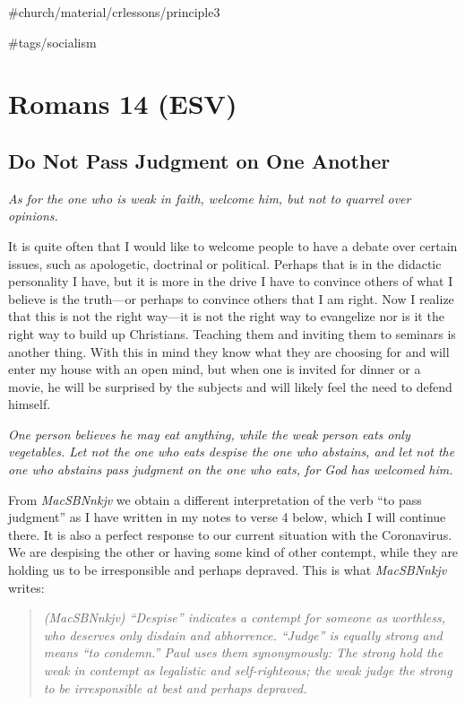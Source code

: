 \#church/material/crlessons/principle3

 \#tags/socialism

\hypertarget{romans-14-esv}{%
\section{Romans 14 (ESV)}\label{romans-14-esv}}
\vspace{10.5cm}
\subsection{Do Not Pass Judgment on One Another} \emph{As for the one who is
weak in faith, welcome him, but not to quarrel over opinions.}

It is quite often that I would like to welcome people to have a debate
over certain issues, such as apologetic, doctrinal or political. Perhaps
that is in the didactic personality I have, but it is more in the drive
I have to convince others of what I believe is the truth---or perhaps to
convince others that I am right. Now I realize that this is not the
right way---it is not the right way to evangelize nor is it the right
way to build up Christians. Teaching them and inviting them to seminars
is another thing. With this in mind they know what they are choosing for
and will enter my house with an open mind, but when one is invited for
dinner or a movie, he will be surprised by the subjects and will likely
feel the need to defend himself.

\emph{One person believes he may eat anything, while the weak person
eats only vegetables. Let not the one who eats despise the one who
abstains, and let not the one who abstains pass judgment on the one who
eats, for God has welcomed him.}

From \emph{MacSBNnkjv} we obtain a different interpretation of the verb
``to pass judgment'' as I have written in my notes to verse 4 below,
which I will continue there. It is also a perfect response to our
current situation with the Coronavirus. We are despising the other or
having some kind of other contempt, while they are holding us to be
irresponsible and perhaps depraved. This is what \emph{MacSBNnkjv}
writes:

\begin{quote}
\emph{(MacSBNnkjv) ``Despise'' indicates a contempt for someone as
worthless, who deserves only disdain and abhorrence. ``Judge'' is
equally strong and means ``to condemn.'' Paul uses them synonymously:
The strong hold the weak in contempt as legalistic and self-righteous;
the weak judge the strong to be irresponsible at best and perhaps
depraved.}
\end{quote}


